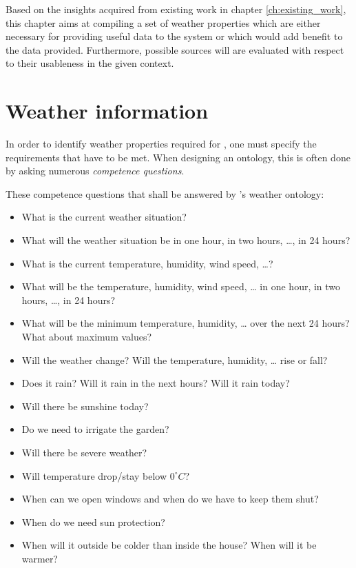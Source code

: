 

Based on the insights acquired from existing work in chapter \ref{ch:existing_work}, this chapter aims at compiling a set of weather properties which are either necessary for providing useful data to the \thinkhome system or which would add benefit to the data provided. Furthermore, possible sources will are evaluated with respect to their usableness in the given context.

\section{Weather information}

In order to identify weather properties required for \thinkhome, one must specify the requirements that have to be met. When designing an ontology, this is often done by asking numerous \emph{competence questions}.

These competence questions that shall be answered by \thinkhome's weather ontology:

\begin{itemize}
  \item What is the current weather situation?
  \item What will the weather situation be in one hour, in two hours, …, in 24 hours?
  \item What is the current temperature, humidity, wind speed, …?
  \item What will be the temperature, humidity, wind speed, … in one hour, in two hours, …, in 24 hours?
  \item What will be the minimum temperature, humidity, … over the next 24 hours? What about maximum values?
  \item Will the weather change? Will the temperature, humidity, … rise or fall?
  \item Does it rain? Will it rain in the next hours? Will it rain today?
  \item Will there be sunshine today? 
  \item Do we need to irrigate the garden?
  \item Will there be severe weather?
  \item Will temperature drop/stay below $0^\circ C$?
  \item When can we open windows and when do we have to keep them shut?
  \item When do we need sun protection?
  \item When will it outside be colder than inside the house? When will it be warmer?
\end{itemize}

